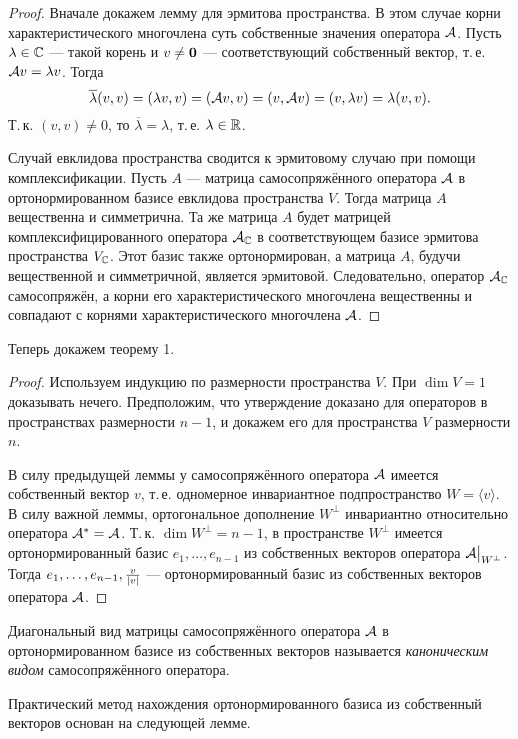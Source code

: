 \begin{proof}
    Вначале докажем лемму для эрмитова пространства. В этом случае корни характеристического многочлена суть собственные значения оператора $\mathcal{A}$. Пусть $\lambda \in \mathbb{C}$ --- такой корень и $v \ne \boldsymbol{0}$ --- соответствующий собственный вектор, т.\,е. $\mathcal{A} v = \lambda v$. Тогда
    \[
        \overline{\lambda}(v, v) = (\lambda v, v) = (\mathcal{A} v, v) = (v, \mathcal{A} v) = (v, \lambda v) = \lambda(v, v).
    \]
    Т.\,к. $(v, v) \ne 0$, то $\overline{\lambda} = \lambda$, т.\,е. $\lambda \in \mathbb{R}$.

    Случай евклидова пространства сводится к эрмитовому случаю при помощи комплексификации. Пусть $A$ --- матрица самосопряжённого оператора $\mathcal{A}$ в ортонормированном базисе евклидова пространства $V$. Тогда матрица $A$ вещественна и симметрична. Та же матрица $A$ будет матрицей комплексифицированного оператора $\mathcal{A}_{\mathbb{C}}$ в соответствующем базисе эрмитова пространства $V_{\mathbb{C}}$. Этот базис также ортонормирован, а матрица $A$, будучи вещественной и симметричной, является эрмитовой. Следовательно, оператор $\mathcal{A}_{\mathbb{C}}$ самосопряжён, а корни его характеристического многочлена вещественны и совпадают с корнями характеристического многочлена $\mathcal{A}$.
\end{proof}

Теперь докажем теорему 1.

\begin{proof}
    Используем индукцию по размерности пространства $V$. При $\dim V = 1$ доказывать нечего. Предположим, что утверждение доказано для операторов в пространствах размерности $n - 1$, и докажем его для пространства $V$ размерности $n$.

    В силу предыдущей леммы у самосопряжённого оператора $\mathcal{A}$ имеется собственный вектор $v$, т.\,е. одномерное инвариантное подпространство $W = \langle v\rangle$. В силу важной леммы, ортогональное дополнение $W^\perp$ инвариантно относительно оператора $\mathcal{A}^\ast = \mathcal{A}$. Т.\,к. $\dim W^\perp = n - 1$, в пространстве $W^\perp$ имеется ортонормированный базис $e_1, \ldots, e_{n - 1}$ из собственных векторов оператора $\mathcal{A}\big|_{W^\perp}$. Тогда $e_1, \ldots, e_{n - 1}, \frac{v}{\left\lvert v\right\rvert}$ --- ортонормированный базис из собственных векторов оператора $\mathcal{A}$.
\end{proof}

Диагональный вид матрицы самосопряжённого оператора $\mathcal{A}$ в ортонормированном базисе из собственных векторов называется \textit{каноническим видом} самосопряжённого оператора.

Практический метод нахождения ортонормированного базиса из собственный векторов основан на следующей лемме.

